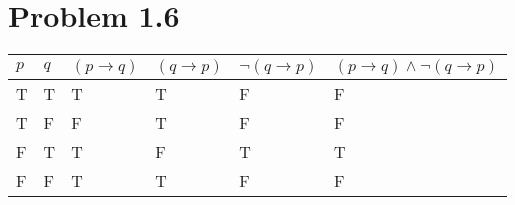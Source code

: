 \documentclass[10pt]{article}
\begin{document}
\section*{Problem 1.6}
\begin{table}[h]
    \begin{tabular}{|l|l|l|l|l|l|}
    \hline
    $p$ & $q$ & $(p\rightarrow q)$ & $(q\rightarrow p)$ & $\lnot(q\rightarrow p)$ & $(p\rightarrow q)\land\lnot(q\rightarrow p)$ \\ \hline
    T   & T   & T                  & T                  & F                       & F                                            \\ \hline
    T   & F   & F                  & T                  & F                       & F                                            \\ \hline
    F   & T   & T                  & F                  & T                       & T                                            \\ \hline
    F   & F   & T                  & T                  & F                       & F                                            \\ \hline
    \end{tabular}
    \end{table}
\end{document}
